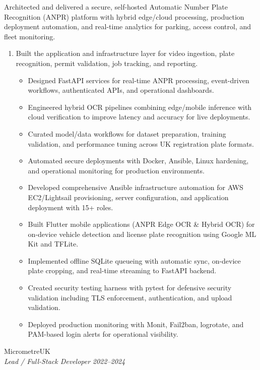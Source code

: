 \documentclass{article}
\begin{document}
Architected and delivered a secure, self-hosted Automatic Number Plate Recognition (ANPR) platform with hybrid edge/cloud processing, production deployment automation, and real-time analytics for parking, access control, and fleet monitoring.
\begin{enumerate}
    \item[] Built the application and infrastructure layer for video ingestion, plate recognition, permit validation, job tracking, and reporting.
   \begin{itemize}
    \item Designed FastAPI services for real-time ANPR processing, event-driven workflows, authenticated APIs, and operational dashboards.
    \item Engineered hybrid OCR pipelines combining edge/mobile inference with cloud verification to improve latency and accuracy for live deployments.
    \item Curated model/data workflows for dataset preparation, training validation, and performance tuning across UK registration plate formats.
    \item Automated secure deployments with Docker, Ansible, Linux hardening, and operational monitoring for production environments.
    \item Developed comprehensive Ansible infrastructure automation for AWS EC2/Lightsail provisioning, server configuration, and application deployment with 15+ roles.
    \item Built Flutter mobile applications (ANPR Edge OCR \& Hybrid OCR) for on-device vehicle detection and license plate recognition using Google ML Kit and TFLite.
    \item Implemented offline SQLite queueing with automatic sync, on-device plate cropping, and real-time streaming to FastAPI backend.
    \item Created security testing harness with pytest for defensive security validation including TLS enforcement, authentication, and upload validation.
    \item Deployed production monitoring with Monit, Fail2ban, logrotate, and PAM-based login alerts for operational visibility.
   \end{itemize}
\end{enumerate}

\vspace{1.5em}
{\bf}{} MicrometreUK \hfill {} \\
{\em Lead / Full-Stack Developer} \hfill {\em 2022–2024} %
\end{document}
